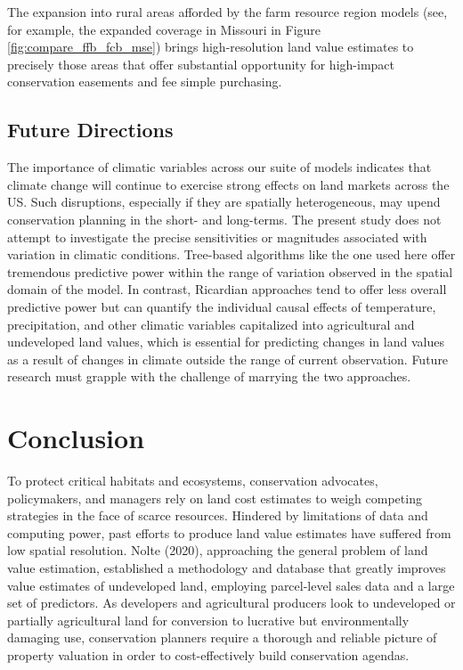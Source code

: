 \documentclass[12pt]{article}
\begin{document}
The expansion into rural areas afforded by the farm resource region models (see, for example, the expanded coverage in Missouri in Figure \ref{fig:compare_ffb_fcb_mse}) brings high-resolution land value estimates to precisely those areas that offer substantial opportunity for high-impact conservation easements and fee simple purchasing.

\subsection{Future Directions}

The importance of climatic variables across our suite of models indicates that climate change will continue to exercise strong effects on land markets across the US. Such disruptions, especially if they are spatially heterogeneous, may upend conservation planning in the short- and long-terms. The present study does not attempt to investigate the precise sensitivities or magnitudes associated with variation in climatic conditions. Tree-based algorithms like the one used here offer tremendous predictive power within the range of variation observed in the spatial domain of the model. In contrast, Ricardian approaches tend to offer less overall predictive power but can quantify the individual causal effects of temperature, precipitation, and other climatic variables capitalized into agricultural and undeveloped land values, which is essential for predicting changes in land values as a result of changes in climate outside the range of current observation. Future research must grapple with the challenge of marrying the two approaches.  

\section{Conclusion}

To protect critical habitats and ecosystems, conservation advocates, policymakers, and managers rely on land cost estimates to weigh competing strategies in the face of scarce resources. Hindered by limitations of data and computing power, past efforts to produce land value estimates have suffered from low spatial resolution. Nolte (2020), approaching the general problem of land value estimation, established a methodology and database that greatly improves value estimates of undeveloped land, employing parcel-level sales data and a large set of predictors. As developers and agricultural producers look to undeveloped or partially agricultural land for conversion to lucrative but environmentally damaging use, conservation planners require a thorough and reliable picture of property valuation in order to cost-effectively build conservation agendas.
\end{document}
